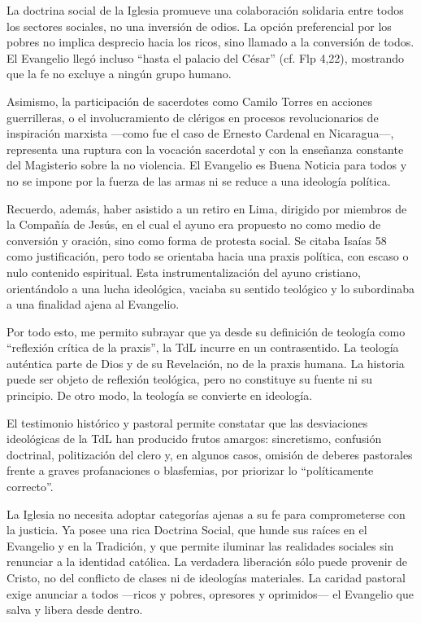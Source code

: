 \documentclass[12pt]{article}
\begin{document}
La doctrina social de la Iglesia promueve una colaboración solidaria entre todos los sectores sociales, no una inversión de odios. La opción preferencial por los pobres no implica desprecio hacia los ricos, sino llamado a la conversión de todos. El Evangelio llegó incluso “hasta el palacio del César” (cf. Flp 4,22), mostrando que la fe no excluye a ningún grupo humano.

Asimismo, la participación de sacerdotes como Camilo Torres en acciones guerrilleras, o el involucramiento de clérigos en procesos revolucionarios de inspiración marxista —como fue el caso de Ernesto Cardenal en Nicaragua—, representa una ruptura con la vocación sacerdotal y con la enseñanza constante del Magisterio sobre la no violencia. El Evangelio es Buena Noticia para todos y no se impone por la fuerza de las armas ni se reduce a una ideología política.

Recuerdo, además, haber asistido a un retiro en Lima, dirigido por miembros de la Compañía de Jesús, en el cual el ayuno era propuesto no como medio de conversión y oración, sino como forma de protesta social. Se citaba Isaías 58 como justificación, pero todo se orientaba hacia una praxis política, con escaso o nulo contenido espiritual. Esta instrumentalización del ayuno cristiano, orientándolo a una lucha ideológica, vaciaba su sentido teológico y lo subordinaba a una finalidad ajena al Evangelio.

Por todo esto, me permito subrayar que ya desde su definición de teología como “reflexión crítica de la praxis”, la TdL incurre en un contrasentido. La teología auténtica parte de Dios y de su Revelación, no de la praxis humana. La historia puede ser objeto de reflexión teológica, pero no constituye su fuente ni su principio. De otro modo, la teología se convierte en ideología.

El testimonio histórico y pastoral permite constatar que las desviaciones ideológicas de la TdL han producido frutos amargos: sincretismo, confusión doctrinal, politización del clero y, en algunos casos, omisión de deberes pastorales frente a graves profanaciones o blasfemias, por priorizar lo “políticamente correcto”.

La Iglesia no necesita adoptar categorías ajenas a su fe para comprometerse con la justicia. Ya posee una rica Doctrina Social, que hunde sus raíces en el Evangelio y en la Tradición, y que permite iluminar las realidades sociales sin renunciar a la identidad católica. La verdadera liberación sólo puede provenir de Cristo, no del conflicto de clases ni de ideologías materiales. La caridad pastoral exige anunciar a todos —ricos y pobres, opresores y oprimidos— el Evangelio que salva y libera desde dentro.
\end{document}

